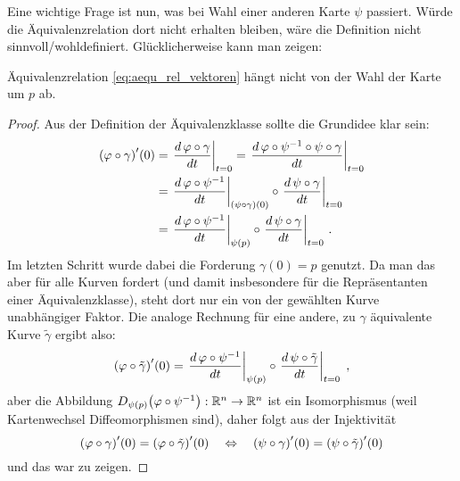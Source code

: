 \documentclass[../H_Analysis_main.tex]{subfiles}
\begin{document}
Eine wichtige Frage ist nun, was bei Wahl einer anderen Karte $\psi$ passiert. Würde die Äquivalenzrelation dort nicht erhalten bleiben, wäre die Definition nicht sinnvoll/wohldefiniert. Glücklicherweise kann man zeigen:

\begin{satz}[Kartenunabhängigkeit]
Äquivalenzrelation \eqref{eq:aequ_rel_vektoren} hängt nicht von der Wahl der Karte um $p$ ab.
\end{satz}
\begin{proof}
Aus der Definition der Äquivalenzklasse sollte die Grundidee klar sein:
\begin{align*}
\qty(\varphi \circ \gamma)'(0) &= \eval{\dv{\, \varphi \circ \gamma}{t}}_{t = 0} = \eval{\dv{\, \varphi  \circ \psi^{-1} \circ \psi \circ \gamma}{t}}_{t = 0} %
\\
&= \eval{\dv{\, \varphi  \circ \psi^{-1}}{t}}_{\qty(\psi \circ \gamma)(0)} \circ \eval{\dv{\, \psi \circ \gamma}{t}}_{t = 0} %
\\
&= \eval{\dv{\, \varphi \circ \psi^{-1}}{t}}_{\psi(p)} \circ \eval{\dv{\, \psi \circ \gamma}{t}}_{t = 0} \, . %
\end{align*}
Im letzten Schritt wurde dabei die Forderung $\gamma(0) = p$ genutzt. Da man das aber für alle Kurven fordert (und damit insbesondere für die Repräsentanten einer Äquivalenzklasse), steht dort nur ein von der gewählten Kurve unabhängiger Faktor. Die analoge Rechnung für eine andere, zu $\gamma$ äquivalente Kurve $\tilde{\gamma}$ ergibt also:
\begin{equation*}
\qty(\varphi \circ \tilde{\gamma})'(0) = \eval{\dv{\, \varphi  \circ \psi^{-1}}{t}}_{\psi(p)} \circ \eval{\dv{\, \psi \circ \tilde{\gamma}}{t}}_{t = 0} \; ,  %
\end{equation*}
aber die Abbildung $D_{\psi(p)} \qty(\varphi  \circ \psi^{-1}): \mathbb{R}^n \rightarrow \mathbb{R}^n$
ist ein Isomorphismus (weil Kartenwechsel Diffeomorphismen sind), daher folgt aus der Injektivität
\begin{equation*}
\qty(\varphi \circ \gamma)'(0) = \qty(\varphi \circ \tilde{\gamma})'(0) \quad \Leftrightarrow \quad \qty(\psi \circ \gamma)'(0) = \qty(\psi \circ \tilde{\gamma})'(0)
\end{equation*}
und das war zu zeigen.
\end{proof}
\end{document}
